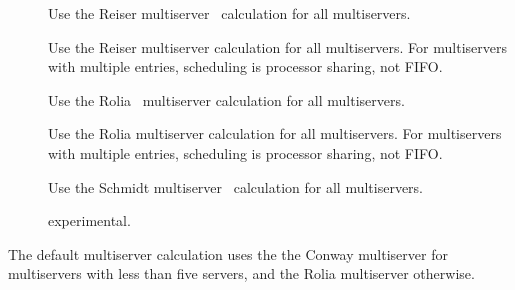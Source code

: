 \begin{description}
\begin{description}
\item[]
Use the Reiser multiserver~\cite{queue:reiser-79} calculation for all multiservers.
\item[]
Use the Reiser multiserver calculation for all multiservers. For multiservers with multiple entries, scheduling is processor sharing, not FIFO. 
\item[]
Use the Rolia~\cite{perf:rolia-92,perf:rolia-95-ieeese-mol} multiserver calculation for all multiservers.
\item[]
Use the Rolia multiserver calculation for all multiservers. For multiservers with multiple entries, scheduling is processor sharing, not FIFO. 
\item[]
Use the Schmidt multiserver~\cite{queue:schmidt-97} calculation for all multiservers.
\item[]
experimental.
\end{description}
The default multiserver calculation uses the the Conway multiserver for multiservers with less than five servers, and the Rolia multiserver otherwise.


\end{description}
